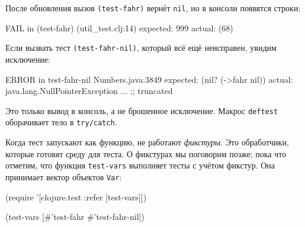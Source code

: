 После обновления вызов \verb|(test-fahr)| вернёт \verb|nil|, но в консоли
появятся строки:

\begin{english}
  \begin{clojure}
FAIL in (test-fahr) (util_test.clj:14)
expected: 999
  actual: (68)
  \end{clojure}
\end{english}

Если вызвать тест \verb|(test-fahr-nil)|, который всё ещё неисправен,
увидим исключение:

\ifx\devicetype\mobile

\begin{english}
  \begin{clojure}
ERROR in test-fahr-nil Numbers.java:3849
expected: (nil? (->fahr nil))
  actual: java.lang.NullPointerException
    ... ;; truncated
  \end{clojure}
\end{english}

\else

\begin{english}
\end{english}

\fi

Это только вывод в консоль, а не брошенное исключение. Макрос \verb|deftest|
оборачивает тело в \verb|try/catch|.

Когда тест запускают как функцию, не работают \emph{фикстуры}. Это обработчики,
которые готовят среду для теста. О фикстурах мы поговорим позже; пока что
отметим, что функция \verb|test-vars| выполняет тесты с учётом фикстур. Она
принимает вектор объектов \verb|Var|:

\ifx\devicetype\mobile

\begin{english}
  \begin{clojure}
(require
  '[clojure.test :refer [test-vars]])

(test-vars
  [#'test-fahr #'test-fahr-nil])
  \end{clojure}
\end{english}

\else

